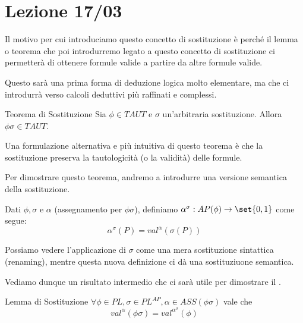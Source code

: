 \chapter{Lezione 17/03}

Il motivo per cui introduciamo questo concetto di sostituzione è perché il lemma o teorema che poi introdurremo legato a questo concetto di sostituzione ci permetterà di ottenere formule valide a partire da altre formule valide.

Questo sarà una prima forma di deduzione logica molto elementare, ma che ci introdurrà verso calcoli deduttivi più raffinati e complessi.

\begin{theorem}[namedlabel={thm:substitution}{Teorema di Sostituzione}]{Teorema di Sostituzione}
  Sia \(\phi\in TAUT\) e \(\sigma\) un'arbitraria sostituzione. Allora \(\phi\sigma\in TAUT\).
\end{theorem}

\begin{note}{}
  Una formulazione alternativa e più intuitiva di questo teorema è che la sostituzione preserva la tautologicità (o la validità) delle formule.
\end{note}

Per dimostrare questo teorema, andremo a introdurre una versione semantica della sostituzione.

Dati \(\phi, \sigma\) e \(\alpha\) (assegnamento per \(\phi\sigma\)), definiamo \(\alpha^\sigma:AP(\phi)\to\set{0,1}\) come segue:
\[\alpha^\sigma(P)=val^\alpha(\sigma(P))\]

Possiamo vedere l'applicazione di \(\sigma\) come una mera sostituzione sintattica (renaming), mentre questa nuova definizione ci dà una sostituziuone semantica.

Vediamo dunque un risultato intermedio che ci sarà utile per dimostrare il .
\begin{lemma}[namedlabel={lem:substitution}{Lemma di Sostituzione}]{Lemma di Sostituzione}
  \(\forall \phi \in PL, \sigma \in PL^{AP}, \alpha \in ASS(\phi\sigma)\) vale che
  \[val^\alpha(\phi\sigma)=val^{\alpha^\sigma}(\phi)\]
\end{lemma}


